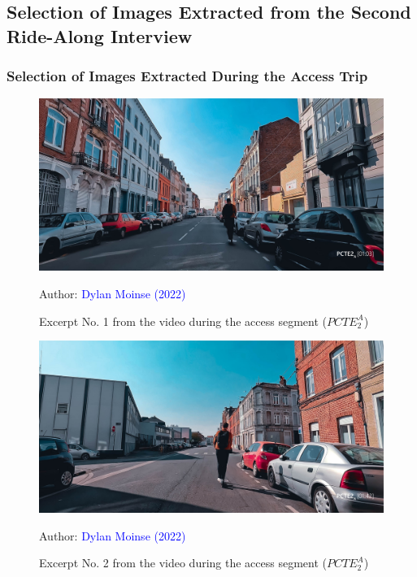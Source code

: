     \newpage
\subsection{Selection of Images Extracted from the Second Ride-Along Interview}
    \label{annexes:photos-pcte2}

\subsubsection{Selection of Images Extracted During the Access Trip}

    \begin{figure}[h!]\vspace*{4pt}
        \caption*{Excerpt No. 1 from the video during the access segment (\(PCTE^{A}_{2}\))}
        \centerline{\includegraphics[width=0.75\columnwidth]{src/Figures/Annexes/Extrait_Video_PCTE2_Access_1.jpg}}
        \vspace{5pt}
        \begin{flushright}\scriptsize{
        Author: \textcolor{blue}{Dylan Moinse (2022)}
        }\end{flushright}
    \end{figure}

    \begin{figure}[h!]\vspace*{4pt}
        \caption*{Excerpt No. 2 from the video during the access segment (\(PCTE^{A}_{2}\))}
        \centerline{\includegraphics[width=0.75\columnwidth]{src/Figures/Annexes/Extrait_Video_PCTE2_Access_2.jpg}}
        \vspace{5pt}
        \begin{flushright}\scriptsize{
        Author: \textcolor{blue}{Dylan Moinse (2022)}
        }\end{flushright}
    \end{figure}
    

